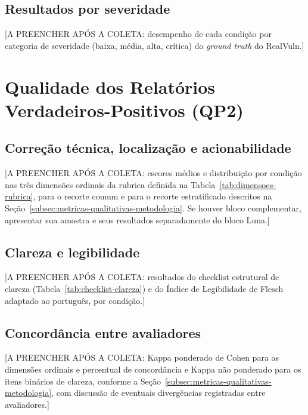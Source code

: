 \subsection{Resultados por severidade}\label{subsec:resultados-por-severidade}

[A PREENCHER APÓS A COLETA: desempenho de cada condição por categoria de severidade (baixa, média, alta, crítica) do \textit{ground truth} do RealVuln.]

\section{Qualidade dos Relatórios Verdadeiros-Positivos (QP2)}\label{sec:qualidade-relatorios}

\subsection{Correção técnica, localização e acionabilidade}\label{subsec:resultados-rubrica}

[A PREENCHER APÓS A COLETA: escores médios e distribuição por condição nas três dimensões ordinais da rubrica definida na Tabela~\ref{tab:dimensoes-rubrica}, para o recorte comum e para o recorte estratificado descritos na Seção~\ref{subsec:metricas-qualitativas-metodologia}. Se houver bloco complementar, apresentar sua amostra e seus resultados separadamente do bloco Luna.]

\subsection{Clareza e legibilidade}\label{subsec:resultados-clareza}

[A PREENCHER APÓS A COLETA: resultados do checklist estrutural de clareza (Tabela~\ref{tab:checklist-clareza}) e do Índice de Legibilidade de Flesch adaptado ao português, por condição.]

\subsection{Concordância entre avaliadores}\label{subsec:resultados-concordancia}

[A PREENCHER APÓS A COLETA: Kappa ponderado de Cohen para as dimensões ordinais e percentual de concordância e Kappa não ponderado para os itens binários de clareza, conforme a Seção~\ref{subsec:metricas-qualitativas-metodologia}, com discussão de eventuais divergências registradas entre avaliadores.]

